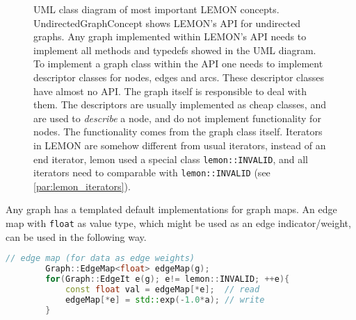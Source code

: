 \begin{figure}[H]
\begin{center}
    \end{center}
    \caption{
        UML class diagram of most important LEMON concepts.
        UndirectedGraphConcept shows LEMON's API for undirected 
        graphs. Any graph implemented within LEMON's API 
        needs to implement all methods and typedefs showed 
        in the UML diagram.
        To implement a graph class within the API one needs 
        to implement descriptor classes for nodes, edges and arcs.
        These descriptor classes have almost no API.
        The graph itself is responsible to deal with them.
        The descriptors are usually implemented as cheap classes,
        and are used to \emph{describe} a node, and do not implement
        functionality for nodes.
        The functionality comes from the graph class itself.
        Iterators in LEMON are somehow different from usual 
        iterators, instead of an end iterator, lemon used a special
        class \lstinline{lemon::INVALID}, and all iterators
        need to comparable with \lstinline{lemon::INVALID} (see \cref{par:lemon_iterators}).
    }\label{fig:uml_lemon_graph_concepts}
    \end{figure}






        Any graph has a templated default implementations for graph maps.
        An edge map with \lstinline{float} as value type, which might
        be used as an edge indicator/weight, can be 
        used in the following way.

        \begin{lstlisting}[language=c++]
        // edge map (for data as edge weights)
        Graph::EdgeMap<float> edgeMap(g); 
        for(Graph::EdgeIt e(g); e!= lemon::INVALID; ++e){
            const float val = edgeMap[*e];  // read
            edgeMap[*e] = std::exp(-1.0*a); // write
        }
        \end{lstlisting}

